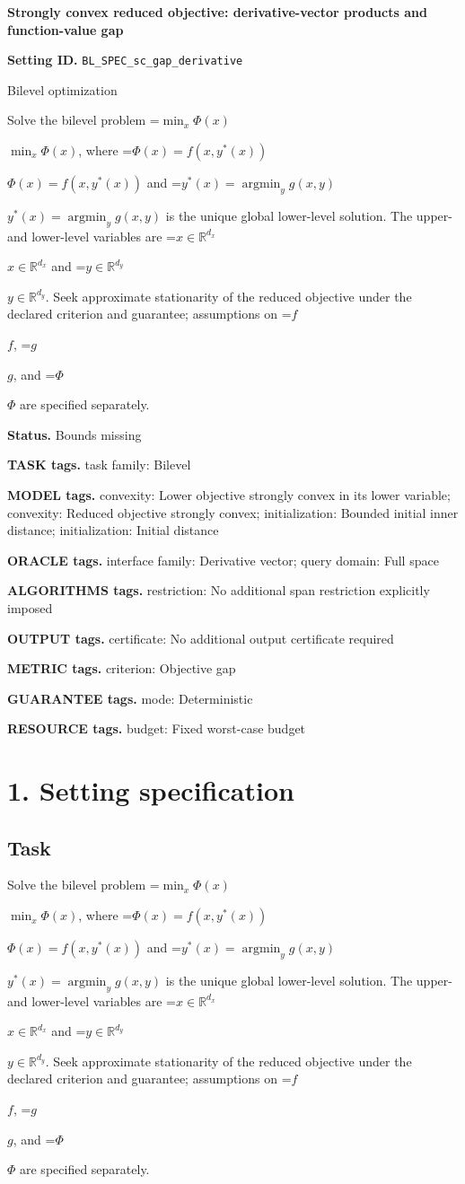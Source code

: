 \documentclass[10pt,a4paper]{article}
\newcommand{\AtlasMath}[1]{\par\begingroup\centering\setbox0=\hbox{$\displaystyle #1$}\ifdim\wd0>1.4\linewidth\typeout{ATLAS WIDE FORMULA: \the\wd0}\fi\ifdim\wd0>\linewidth\resizebox{\linewidth}{!}{\box0}\else\box0\fi\par\endgroup}
\newcommand{\AtlasInlineMath}[1]{\begingroup\setbox0=\hbox{$#1$}\ifdim\wd0>.4\linewidth\endgroup\AtlasMath{#1}\else\endgroup$#1$\fi}
\begin{document}
\raggedright

{\LARGE\bfseries\sffamily\color{AtlasNavy} Strongly convex reduced objective: derivative-vector products and function-value gap\par}\vspace{5pt}
\textbf{Setting ID.} \texttt{BL\_\allowbreak{}SPEC\_\allowbreak{}sc\_\allowbreak{}gap\_\allowbreak{}derivative}

Bilevel optimization

Solve the bilevel problem \AtlasInlineMath{\min_x\Phi(x)}, where \AtlasInlineMath{\Phi(x)=f(x,y^*(x))} and \AtlasInlineMath{y^*(x)=\operatorname*{argmin}_y g(x,y)} is the unique global lower-level solution. The upper- and lower-level variables are \AtlasInlineMath{x\in\mathbb{R}^{d_x}} and \AtlasInlineMath{y\in\mathbb{R}^{d_y}}. Seek approximate stationarity of the reduced objective under the declared criterion and guarantee; assumptions on \AtlasInlineMath{f}, \AtlasInlineMath{g}, and \AtlasInlineMath{\Phi} are specified separately.

\textbf{Status.} Bounds missing

\textbf{TASK tags.} task family: Bilevel

\textbf{MODEL tags.} convexity: Lower objective strongly convex in its lower variable; convexity: Reduced objective strongly convex; initialization: Bounded initial inner distance; initialization: Initial distance

\textbf{ORACLE tags.} interface family: Derivative vector; query domain: Full space

\textbf{ALGORITHMS tags.} restriction: No additional span restriction explicitly imposed

\textbf{OUTPUT tags.} certificate: No additional output certificate required

\textbf{METRIC tags.} criterion: Objective gap

\textbf{GUARANTEE tags.} mode: Deterministic

\textbf{RESOURCE tags.} budget: Fixed worst-case budget

\section{1. Setting specification}
\subsection{Task}
Solve the bilevel problem \AtlasInlineMath{\min_x\Phi(x)}, where \AtlasInlineMath{\Phi(x)=f(x,y^*(x))} and \AtlasInlineMath{y^*(x)=\operatorname*{argmin}_y g(x,y)} is the unique global lower-level solution. The upper- and lower-level variables are \AtlasInlineMath{x\in\mathbb{R}^{d_x}} and \AtlasInlineMath{y\in\mathbb{R}^{d_y}}. Seek approximate stationarity of the reduced objective under the declared criterion and guarantee; assumptions on \AtlasInlineMath{f}, \AtlasInlineMath{g}, and \AtlasInlineMath{\Phi} are specified separately.
\end{document}
